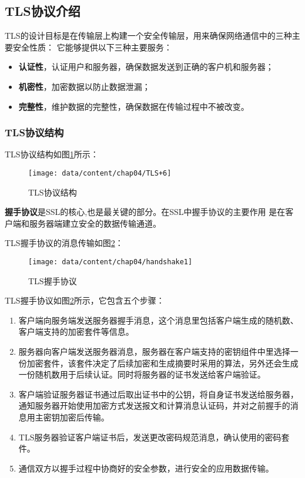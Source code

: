 \subsection{TLS协议介绍}
TLS的设计目标是在传输层上构建一个安全传输层，用来确保网络通信中的三种主要安全性质：
它能够提供以下三种主要服务：
\begin{itemize}
\item \textbf{认证性}，认证用户和服务器，确保数据发送到正确的客户机和服务器；

\item \textbf{机密性}，加密数据以防止数据泄漏；

\item \textbf{完整性}，维护数据的完整性，确保数据在传输过程中不被改变。
\end{itemize}
\subsubsection{TLS协议结构}
TLS协议结构如图\ref{fig-TLSstructure}所示：

\begin{figure}[htp]
	\centering
	\texttt{[image: data/content/chap04/TLS+6]}
	\caption{TLS协议结构}
	\label{fig-TLSstructure}
\end{figure}

\textbf{握手协议}是SSL的核心,也是最关键的部分。在SSL中握手协议的主要作用
是在客户端和服务器端建立安全的数据传输通道。

TLS握手协议的消息传输如图\ref{fig-handshake}：
\begin{figure}[htp]
\centering\texttt{[image: data/content/chap04/handshake1]}
\caption{TLS握手协议}
\label{fig-handshake}
\end{figure}

TLS握手协议如图\ref{fig-handshake}所示，它包含五个步骤：
\begin{enumerate}\item  客户端向服务端发送服务器握手消息，这个消息里包括客户端生成的随机数、客户端支持的加密套件等信息。
\item  服务器向客户端发送服务器消息，服务器在客户端支持的密钥组件中里选择一份加密套件，该套件决定了后续加密和生成摘要时采用的算法，另外还会生成一份随机数用于后续认证。同时将服务器的证书发送给客户端验证。
\item  客户端验证服务器证书通过后取出证书中的公钥，将自身证书发送给服务器，通知服务器开始使用加密方式发送报文和计算消息认证码，并对之前握手的消息用主密钥加密后传输。
\item  TLS服务器验证客户端证书后，发送更改密码规范消息，确认使用的密码套件。
\item  通信双方以握手过程中协商好的安全参数，进行安全的应用数据传输。
\end{enumerate}

